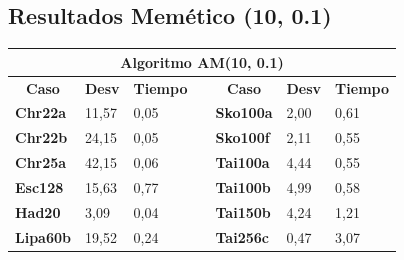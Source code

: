 \documentclass[a4paper, 12pt]{article}
\begin{document}
      \subsection{Resultados Memético (10, 0.1)}
      \begin{table}[H]
\centering
\label{my-label}
\begin{tabular}{|l|l|l|l|l|l|l|}
\hline
\multicolumn{7}{|c|}{\textbf{Algoritmo AM(10, 0.1)}}                                                                                                                                                                                                     \\ \hline
\multicolumn{1}{|c|}{\textbf{Caso}} & \multicolumn{1}{c|}{\textbf{Desv}} & \multicolumn{1}{c|}{\textbf{Tiempo}} & \multicolumn{1}{c|}{} & \multicolumn{1}{c|}{\textbf{Caso}} & \multicolumn{1}{c|}{\textbf{Desv}} & \multicolumn{1}{c|}{\textbf{Tiempo}} \\ \cline{1-3} \cline{5-7} 
\textbf{Chr22a}                     & 11,57                              & 0,05                                 &                       & \textbf{Sko100a}                   & 2,00                               & 0,61                                 \\ \cline{1-3} \cline{5-7} 
\textbf{Chr22b}                     & 24,15                              & 0,05                                 &                       & \textbf{Sko100f}                   & 2,11                               & 0,55                                 \\ \cline{1-3} \cline{5-7} 
\textbf{Chr25a}                     & 42,15                              & 0,06                                 &                       & \textbf{Tai100a}                   & 4,44                               & 0,55                                 \\ \cline{1-3} \cline{5-7} 
\textbf{Esc128}                     & 15,63                              & 0,77                                 &                       & \textbf{Tai100b}                   & 4,99                               & 0,58                                 \\ \cline{1-3} \cline{5-7} 
\textbf{Had20}                      & 3,09                               & 0,04                                 &                       & \textbf{Tai150b}                   & 4,24                               & 1,21                                 \\ \cline{1-3} \cline{5-7} 
\textbf{Lipa60b}                    & 19,52                              & 0,24                                 &                       & \textbf{Tai256c}                   & 0,47                               & 3,07                                 \\ \cline{1-3} \cline{5-7} 

\end{tabular}
\end{table}
\end{document}
